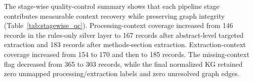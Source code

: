The stage-wise quality-control summary shows that each pipeline stage contributes measurable context recovery while preserving graph integrity (Table~\ref{tab:stagewise_qc}). Processing-context coverage increased from 146 records in the rules-only silver layer to 167 records after abstract-level targeted extraction and 183 records after methods-section extraction. Extraction-context coverage increased from 154 to 170 and then to 185 records. The missing-context flag decreased from 365 to 303 records, while the final normalized KG retained zero unmapped processing/extraction labels and zero unresolved graph edges.
